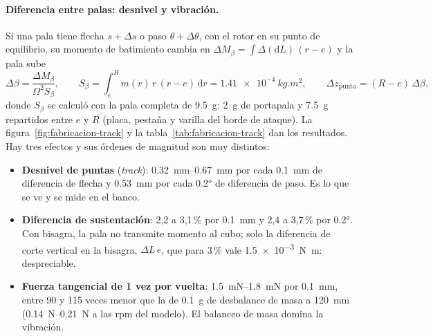 \paragraph{Diferencia entre palas: desnivel y vibración.} Si una pala tiene flecha
$s+\Delta s$ o paso $\theta+\Delta\theta$, con el rotor en su punto de equilibrio, su
momento de batimiento cambia en $\Delta M_\beta=\int\Delta(\mathrm dL)\,(r-e)$ y la pala
sube
\begin{equation}
  \Delta\beta = \frac{\Delta M_\beta}{\Omega^2 S_\beta},\qquad
  S_\beta=\int_e^R m(r)\,r\,(r-e)\,\mathrm dr = \SI{1.41e-4}{kg.m^2},\qquad
  \Delta z_{\text{punta}} = (R-e)\,\Delta\beta,
  \label{eq:fabricacion-track}
\end{equation}
donde $S_\beta$ se calculó con la pala completa de \SI{9.5}{g}: \SI{2}{g} de portapala y
\SI{7.5}{g} repartidos entre $e$ y $R$ (placa, pestaña y varilla del borde de ataque). La
figura~\ref{fig:fabricacion-track} y la tabla~\ref{tab:fabricacion-track} dan los
resultados. Hay tres efectos y sus órdenes de magnitud son muy distintos:
\begin{itemize}
  \item \textbf{Desnivel de puntas} (\emph{track}): \SIrange{0.32}{0.67}{mm} por cada
        \SI{0.1}{mm} de diferencia de flecha y \SI{0.53}{mm} por cada \ang{0.2} de
        diferencia de paso. Es lo que se ve y se mide en el banco.
  \item \textbf{Diferencia de sustentación}: 2,2 a 3,1\,\% por \SI{0.1}{mm} y 2,4 a
        3,7\,\% por \ang{0.2}. Con bisagra, la pala no transmite momento al cubo; solo la
        diferencia de corte vertical en la bisagra, $\Delta L\,e$, que para 3\,\% vale
        \SI{1.5e-3}{N.m}: despreciable.
  \item \textbf{Fuerza tangencial de 1 vez por vuelta}: \SIrange{1.5}{1.8}{mN} por
        \SI{0.1}{mm}, entre 90 y 115 veces menor que la de \SI{0.1}{g} de desbalance de masa a
        \SI{120}{mm} (\SIrange{0.14}{0.21}{N} a las rpm del modelo). El balanceo de masa
        domina la vibración.
\end{itemize}

